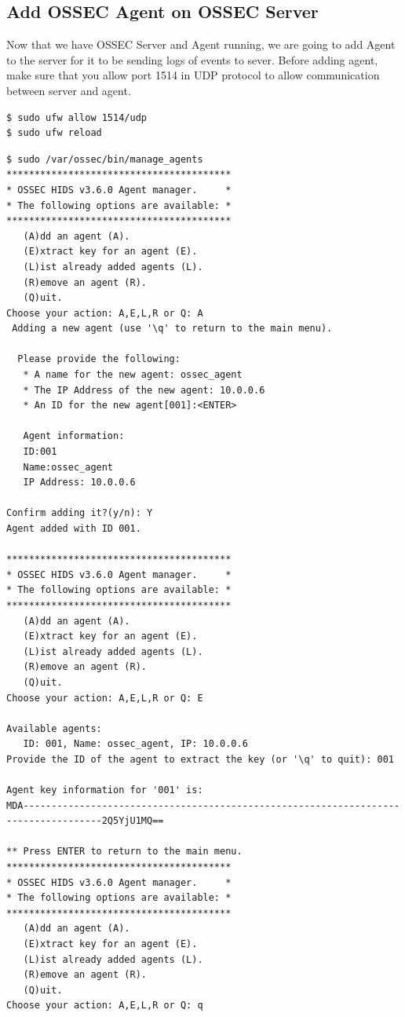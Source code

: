 \documentclass{article}
\begin{document}
\subsection{Add OSSEC Agent on OSSEC Server}
Now that we have OSSEC Server and Agent running, we are going to add Agent to the server for it to be sending logs of events to sever. Before adding agent, make sure that you allow port 1514 in UDP protocol to allow communication between server and agent.
\begin{verbatim}
$ sudo ufw allow 1514/udp
$ sudo ufw reload
\end{verbatim}
\begin{verbatim}
$ sudo /var/ossec/bin/manage_agents
****************************************
* OSSEC HIDS v3.6.0 Agent manager.     *
* The following options are available: *
****************************************
   (A)dd an agent (A).
   (E)xtract key for an agent (E).
   (L)ist already added agents (L).
   (R)emove an agent (R).
   (Q)uit.
Choose your action: A,E,L,R or Q: A
 Adding a new agent (use '\q' to return to the main menu).

  Please provide the following:
   * A name for the new agent: ossec_agent
   * The IP Address of the new agent: 10.0.0.6
   * An ID for the new agent[001]:<ENTER>

   Agent information:
   ID:001
   Name:ossec_agent
   IP Address: 10.0.0.6

Confirm adding it?(y/n): Y
Agent added with ID 001.

****************************************
* OSSEC HIDS v3.6.0 Agent manager.     *
* The following options are available: *
****************************************
   (A)dd an agent (A).
   (E)xtract key for an agent (E).
   (L)ist already added agents (L).
   (R)emove an agent (R).
   (Q)uit.
Choose your action: A,E,L,R or Q: E

Available agents:
   ID: 001, Name: ossec_agent, IP: 10.0.0.6
Provide the ID of the agent to extract the key (or '\q' to quit): 001

Agent key information for '001' is:
MDA------------------------------------------------------------------------------------2Q5YjU1MQ==

** Press ENTER to return to the main menu.
****************************************
* OSSEC HIDS v3.6.0 Agent manager.     *
* The following options are available: *
****************************************
   (A)dd an agent (A).
   (E)xtract key for an agent (E).
   (L)ist already added agents (L).
   (R)emove an agent (R).
   (Q)uit.
Choose your action: A,E,L,R or Q: q


\end{verbatim}
\end{document}
